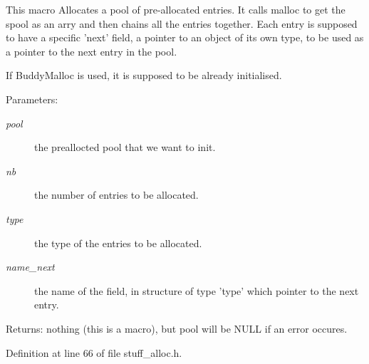 This macro Allocates a pool of pre-allocated entries. It calls malloc to get the spool as an arry and then chains all the entries together. Each entry is supposed to have a specific 'next' field, a pointer to an object of its own type, to be used as a pointer to the next entry in the pool.

If Buddy\-Malloc is used, it is supposed to be already initialised.

\begin{Desc}
\item[Parameters:]
\begin{description}
\item[{\em pool}]the preallocted pool that we want to init. \item[{\em nb}]the number of entries to be allocated. \item[{\em type}]the type of the entries to be allocated. \item[{\em name\_\-next}]the name of the field, in structure of type 'type' which pointer to the next entry.\end{description}
\end{Desc}
\begin{Desc}
\item[Returns:]nothing (this is a macro), but pool will be NULL if an error occures. \end{Desc}


Definition at line 66 of file stuff\_\-alloc.h.